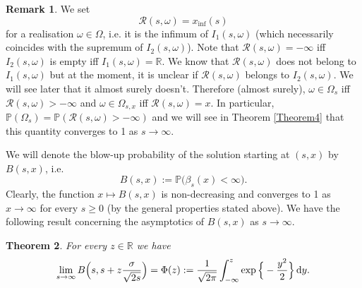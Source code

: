 \documentclass[sn-mathphys-num]{sn-jnl}
\newtheorem{thm}{Theorem}[section]
\theoremstyle{definition}
\newtheorem{rem}[thm]{Remark}
\newcommand{\scr}[1]{\mathscr #1}
\numberwithin{equation}{section} \theoremstyle{remark}
\renewcommand{\d}{\hbox{d}}
\def\R{\mathbb R}
\def\d{\text{\rm{d}}} \def\bb{\beta} \def\aa{\alpha} \def\D{\scr D}
\def\RR{\mathscr R}
\def\P{\mathbb P}
\newcommand{\1}{\mathbbm{1}}
\begin{document}
\begin{rem}
  We set
  \[
    \RR(s,\omega)= x_{\inf}(s)
  \]  
  for a realisation $\omega \in \Omega$, i.e. it   is the
  infimum of $I_1(s,\omega)$ (which necessarily coincides with the
  supremum of $I_2(s,\omega)$). Note that $\RR(s,\omega)=-\infty$ iff
  $I_2(s,\omega)$ is empty iff $I_1(s,\omega)=\R$. We know that
  $\RR(s,\omega)$ does not belong to $I_1(s,\omega)$ but at the
  moment, it is unclear if $\RR(s,\omega)$ belongs to
  $I_2(s,\omega)$. We will see later that it almost surely
  doesn't. Therefore (almost surely), $\omega \in \Omega_s$ iff
  $\RR(s,\omega)>-\infty$ and $\omega \in \Omega_{s,x}$ iff
  $\RR(s,\omega)=x$. In particular,
  $\P(\Omega_s)= \P(\RR(s,\omega)>-\infty)$ and we will see in Theorem
  \ref{Theorem4} that this quantity converges to 1 as $s\to \infty$.
\end{rem}




We will denote the blow-up probability of the solution starting at $(s,x)$ by $B(s,x)$, i.e.
$$
B(s,x):= \P\big(\beta_s(x)<\infty\big).
$$
Clearly, the function $x \mapsto B(s,x)$ is non-decreasing and converges to 1 as $x \to \infty$ for every $s \ge 0$ (by the general properties stated above).  
We have the following result concerning the asymptotics of $B(s,x)$ as $s \to \infty$.
\begin{thm}\label{Theorem2}
  For every $z \in \R$ we have
  $$
\lim_{s \to \infty}B\Big(s,s+z\frac \sigma{\sqrt{2s}}\Big)=\Phi(z):=\frac 1{\sqrt{2\pi}}\int_{-\infty}^z\exp\Big\{ - \frac {y^2}2\Big\}\,\d y. 
  $$
\end{thm}
\end{document}
